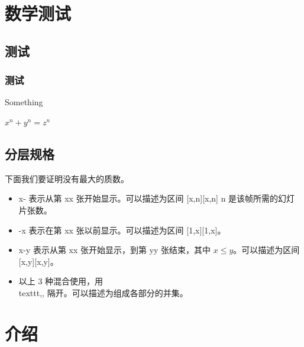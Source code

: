 \documentclass{beamer}
\begin{document}
{%

\section{数学测试}
    \subsection{测试}
    \begin{frame}\frametitle{测试}
        Something \pause %

        $x^n+y^n=z^n$
    \end{frame}

    \subsection{分层规格}
    \begin{frame} 

        下面我们要证明没有最大的质数。
    
        \begin{itemize}
            \item<1-> x- 表示从第 xx 张开始显示。可以描述为区间 [x,n][x,n] n 是该帧所需的幻灯片张数。
            \item<3-> -x 表示在第 xx 张以前显示。可以描述为区间 [1,x][1,x]。
            \item<1-> x-y 表示从第 xx 张开始显示，到第 yy 张结束，其中 $x\le y$。可以描述为区间 [x,y][x,y]。
            \item<2-> 以上 3 种混合使用，用 \\texttt,, 隔开。可以描述为组成各部分的并集。
        \end{itemize}
    
    \end{frame}

\section{介绍}
}
\end{document}
